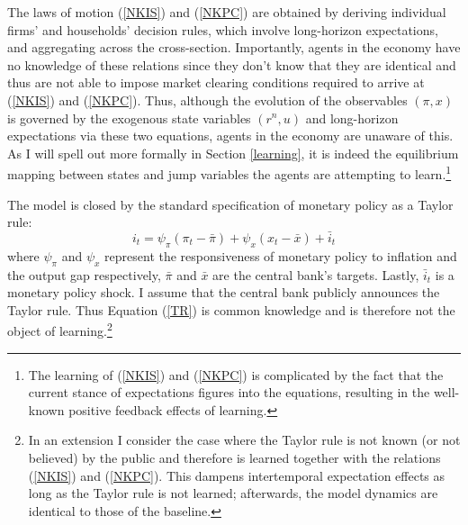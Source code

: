 \documentclass[11pt]{article}
\renewcommand{\[}{\begin{equation}}
\renewcommand{\]}{\end{equation}}
\begin{document}
The laws of motion (\ref{NKIS}) and (\ref{NKPC}) are obtained by deriving individual firms' and households' decision rules, which involve long-horizon expectations, and aggregating across the cross-section. Importantly, agents in the economy have no knowledge of these relations since they don't know that they are identical and thus are not able to impose market clearing conditions required to arrive at (\ref{NKIS}) and (\ref{NKPC}). Thus, although the evolution of the observables $(\pi,x)$ is governed by the exogenous state variables $(r^n, u)$ and long-horizon expectations via these two equations, agents in the economy are unaware of this. As I will spell out more formally in Section \ref{learning}, it is indeed the equilibrium mapping between states and jump variables the agents are attempting to learn.\footnote{The learning of (\ref{NKIS}) and (\ref{NKPC}) is complicated by the fact that the current stance of expectations figures into the equations, resulting in the well-known positive feedback effects of learning.} 

The model is closed by the standard specification of monetary policy as a Taylor rule:
\begin{equation}
i_t = \psi_{\pi}(\pi_t -\bar{\pi}) + \psi_{x} (x_t -\bar{x}) + \bar{i}_t  \label{TR}
\end{equation}
where $\psi_{\pi}$ and $\psi_{x}$ represent the responsiveness of monetary policy to inflation and the output gap respectively, $\bar{\pi}$ and $\bar{x}$ are the central bank's targets. Lastly, $\bar{i}_t$ is a monetary policy shock. I assume that the central bank publicly announces the Taylor rule. Thus Equation (\ref{TR}) is common knowledge and is therefore not the object of learning.\footnote{In an extension I consider the case where the Taylor rule is not known (or not believed) by the public and therefore is learned together with the relations (\ref{NKIS}) and (\ref{NKPC}). This dampens intertemporal expectation effects as long as the Taylor rule is not learned; afterwards, the model dynamics are identical to those of the baseline.} 
\end{document}
